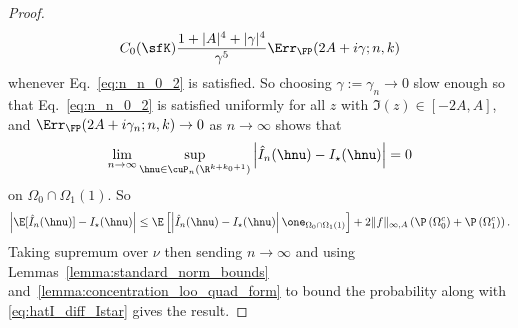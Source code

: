 \begin{proof}
\begin{align*}
   C_0(\sfK) \frac{1 + |A|^4+  |\gamma|^4}{\gamma^5} 
   \Err_{\FP}( 2A + i\gamma;n,k)
\end{align*}
whenever Eq.~\eqref{eq:n_n_0_2} is satisfied. 
So choosing $\gamma := \gamma_n \to 0$ slow enough so that Eq.~\eqref{eq:n_n_0_2} is satisfied uniformly for all $z$ with $\Im(z) \in [-2A,A]$, and $\Err_{\FP}(2A + i\gamma_n; n, k) \to 0$   as $n\to\infty$
shows that 
\begin{equation}
\label{eq:hatI_diff_Istar}
\lim_{n\to\infty}\sup_{\hnu\in\cuP_n(\R^{k+k_0+1})}\left|
    \hat I_n(\hnu)-  I_\star(\hnu)\right| = 0
\end{equation}
on $\Omega_0 \cap \Omega_1(1)$. 
So
\begin{align*}
   \left|\E[\hat I_n(\hnu)] -  I_\star(\hnu)\right| \le 
 \E\left[\left|\hat I_n(\hnu) -  I_\star(\hnu)\right| \one_{\Omega_0 \cap \Omega_1(1)}\right] 
 +
 2\|f\|_{\infty,A}  \left(\P\left(\Omega_0^c \right) + \P\left(
 \Omega_1^c\right)\right).
\end{align*}
Taking supremum over $\nu$ then sending $n\to\infty$ and using 
Lemmas~\ref{lemma:standard_norm_bounds} and~\ref{lemma:concentration_loo_quad_form} to bound the probability along with \eqref{eq:hatI_diff_Istar} gives the result.
\end{proof}



